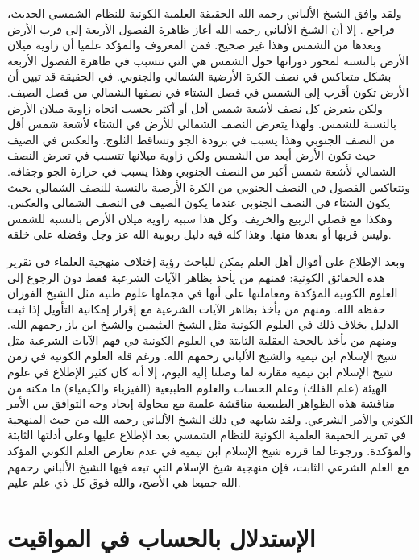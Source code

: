 ولقد وافق الشيخ الألباني رحمه الله الحقيقة العلمية الكونية للنظام الشمسي الحديث، فراجع . إلا أن الشيخ الألباني رحمه الله أعاز ظاهرة الفصول الأربعة إلى قرب الأرض وبعدها من الشمس وهذا غير صحيح. فمن المعروف  والمؤكد علميا أن زاوية ميلان الأرض بالنسبة لمحور دورانها حول الشمس هي التي تتسبب في ظاهرة الفصول الأربعة بشكل متعاكس في نصف الكرة الأرضية الشمالي والجنوبي. في الحقيقة قد تبين أن الأرض تكون أقرب إلى الشمس في فصل الشتاء في نصفها الشمالي من فصل الصيف. ولكن يتعرض كل نصف لأشعة شمس أقل أو أكثر بحسب اتجاه زاوية ميلان الأرض بالنسبة للشمس. ولهذا يتعرض النصف الشمالي للأرض في الشتاء لأشعة شمس أقل من النصف الجنوبي وهذا يسبب في برودة الجو وتساقط الثلوج. والعكس في الصيف حيث تكون الأرض أبعد من الشمس ولكن زاوية ميلانها تتسبب في تعرض النصف الشمالي لأشعة شمس أكبر من النصف الجنوبي وهذا يسبب في حرارة الجو وجفافه. وتتعاكس الفصول في النصف الجنوبي من الكرة الأرضية بالنسبة للنصف الشمالي بحيث يكون الشتاء في النصف الجنوبي عندما يكون الصيف في النصف الشمالي والعكس. وهكذا مع فصلي الربيع والخريف. وكل هذا سببه زاوية ميلان الأرض بالنسبة للشمس وليس قربها أو بعدها منها. وهذا كله فيه دليل ربوبية الله عز وجل وفضله على خلقه. 

وبعد الإطلاع على أقوال أهل العلم يمكن للباحث رؤية إختلاف منهجية العلماء في تقرير هذه الحقائق الكونية: فمنهم من يأخذ بظاهر الآيات الشرعية فقط دون الرجوع إلى العلوم الكونية المؤكدة ومعاملتها على أنها في مجملها علوم ظنية مثل الشيخ الفوزان حفظه الله. ومنهم من يأخذ بظاهر الآيات الشرعية مع إقرار إمكانية التأويل إذا ثبت الدليل بخلاف ذلك في العلوم الكونية مثل الشيخ العثيمين والشيخ ابن باز رحمهم الله. ومنهم من يأخذ بالحجة العقلية الثابتة في العلوم الكونية في فهم الآيات الشرعية مثل شيخ الإسلام ابن تيمية والشيخ الألباني رحمهم الله. ورغم قلة العلوم الكونية في زمن شيخ الإسلام ابن تيمية مقارنة لما وصلنا إليه اليوم، إلا أنه كان كثير الإطلاع في علوم الهيئة (علم الفلك) وعلم الحساب والعلوم الطبيعية (الفيزياء والكيمياء) ما مكنه من مناقشة هذه الظواهر الطبيعية مناقشة علمية مع محاولة إيجاد وجه التوافق بين الأمر الكوني والأمر الشرعي. ولقد شابهه في ذلك الشيخ الألباني رحمه الله من حيث المنهجية في تقرير الحقيقة العلمية الكونية للنظام الشمسي بعد الإطلاع عليها وعلى أدلتها الثابتة والمؤكدة. ورجوعا لما قرره شيخ الإسلام ابن تيمية في عدم تعارض العلم الكوني المؤكد مع العلم الشرعي الثابت، فإن منهجية شيخ الإسلام التي تبعه فيها الشيخ الألباني رحمهم الله جميعا هي الأصح، والله فوق كل ذي علم عليم.

\section{الإستدلال بالحساب في المواقيت}

